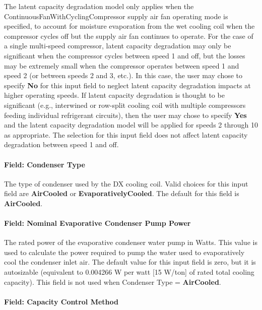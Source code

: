 The latent capacity degradation model only applies when the ContinuousFanWithCyclingCompressor supply air fan operating mode is specified, to account for moisture evaporation from the wet cooling coil when the compressor cycles off but the supply air fan continues to operate. For the case of a single multi-speed compressor, latent capacity degradation may only be significant when the compressor cycles between speed 1 and off, but the losses may be extremely small when the compressor operates between speed 1 and speed 2 (or between speeds 2 and 3, etc.). In this case, the user may chose to specify \textbf{No} for this input field to neglect latent capacity degradation impacts at higher operating speeds. If latent capacity degradation is thought to be significant (e.g., interwined or row-split cooling coil with multiple compressors feeding individual refrigerant circuits), then the user may chose to specify \textbf{Yes} and the latent capacity degradation model will be applied for speeds 2 through 10 as appropriate. The selection for this input field does not affect latent capacity degradation between speed 1 and off.

\paragraph{Field: Condenser Type}\label{field-condenser-type-3}

The type of condenser used by the DX cooling coil. Valid choices for this input field are \textbf{AirCooled} or \textbf{EvaporativelyCooled}. The default for this field is \textbf{AirCooled}.

\paragraph{Field: Nominal Evaporative Condenser Pump Power}\label{field-nominal-evaporative-condenser-pump-power-1}

The rated power of the evaporative condenser water pump in Watts. This value is used to calculate the power required to pump the water used to evaporatively cool the condenser inlet air. The default value for this input field is zero, but it is autosizable (equivalent to 0.004266 W per watt {[}15 W/ton{]} of rated total cooling capacity). This field is not used when Condenser Type = \textbf{AirCooled}.

\paragraph{Field: Capacity Control Method}\label{field-capacity-control-method}

